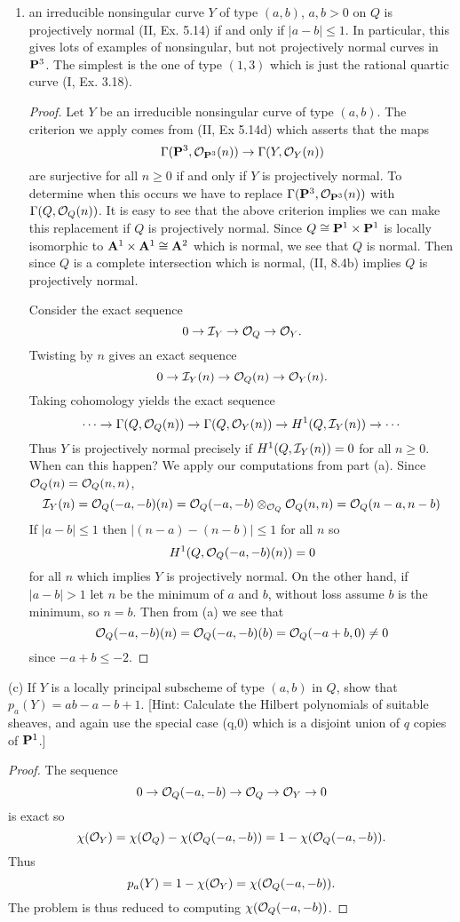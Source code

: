 \documentclass[12pt]{article}
\begin{document}
\begin{exercise}
\begin{enumerate}
\item an irreducible nonsingular curve $Y$ of type $(a,b)$,
$a,b>0$ on $Q$ is projectively normal (II, Ex. 5.14) if 
and only if $|a-b|\leq 1$. In particular, this gives lots
of examples of nonsingular, but not projectively normal curves
in $\P^3$. The simplest is the one of type $(1,3)$ which is
just the rational quartic curve (I, Ex. 3.18). 
\begin{proof}
Let $Y$ be an irreducible nonsingular curve of type $(a,b)$. 
The criterion we apply comes from (II, Ex 5.14d) which asserts
that the maps
$$\Gamma(\P^3,\sO_{\P^3}(n))\into\Gamma(Y,\sO_Y(n))$$
are surjective for all $n\geq 0$ if and only if
$Y$ is projectively normal. To determine when this occurs
we have to replace $\Gamma(\P^3,\sO_{\P^3}(n))$ with 
$\Gamma(Q,\soq(n))$. It is easy to see that the above criterion 
implies we can make this replacement if $Q$ is projectively normal. 
Since $Q\isom\P^1\times\P^1$ is locally isomorphic to 
$\A^1\times\A^1\isom\A^2$ which is normal, we see that $Q$
is normal. Then since $Q$ is a complete intersection which is
normal, (II, 8.4b) implies $Q$ is projectively normal. 

Consider the exact sequence
$$0\into\sI_Y\into\soq\into\sO_Y.$$ 
Twisting by $n$ gives an exact sequence
$$0\into\sI_Y(n)\into\soq(n)\into\sO_Y(n).$$
Taking cohomology yields the exact sequence
$$\cdots\into\Gamma(Q,\soq(n))\into\Gamma(Q,\sO_Y(n))\into
              H^1(Q,\sI_Y(n))\into\cdots$$
Thus $Y$ is projectively normal precisely if
$H^1(Q,\sI_Y(n))=0$ for all $n\geq 0$. When can 
this happen? We apply our computations from part (a).
Since $\soq(n)=\soq(n,n)$,
$$\sI_Y(n)=\soq(-a,-b)(n)=\soq(-a,-b)\tensor_{\soq}\soq(n,n)=\soq(n-a,n-b)$$ 
If $|a-b|\leq 1$ then $|(n-a)-(n-b)|\leq 1$ for all $n$ so
$$H^1(Q,\soq(-a,-b)(n))=0$$ for all $n$ which implies $Y$ is
projectively normal. On the other hand, if $|a-b|>1$ let
$n$ be the minimum of $a$ and $b$, without loss assume $b$ is
the minimum, so $n=b$. Then from (a) we see that
$$\soq(-a,-b)(n)=\soq(-a,-b)(b)=\soq(-a+b,0)\neq 0$$
since $-a+b\leq -2$.  
\end{proof}
\end{enumerate}


(c) If $Y$ is a locally principal subscheme of type $(a,b)$
in $Q$, show that $p_a(Y)=ab-a-b+1.$ [Hint: Calculate the
Hilbert polynomials of suitable sheaves, and again use the
special case (q,0) which is a disjoint union of $q$ copies
of $\P^1$.]
\begin{proof}
The sequence 
$$0\into\soq(-a,-b)\into\soq\into\sO_Y\into{}0$$
is exact so 
$$\chi(\so_Y)=\chi(\soq)-\chi(\soq(-a,-b))=1-\chi(\soq(-a,-b)).$$
Thus 
$$p_a(Y)=1-\chi(\so_Y)=\chi(\soq(-a,-b)).$$
The problem is thus reduced to computing $\chi(\soq(-a,-b))$.


\end{proof}
\end{exercise}
\end{document}
